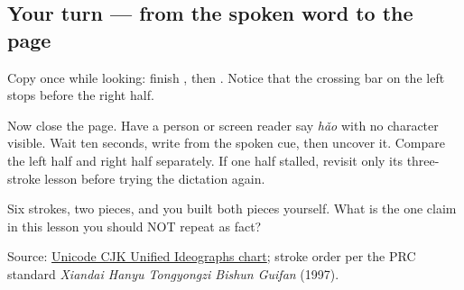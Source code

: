 \subsection*{Your turn — from the spoken word to the page}
Copy \textbf{} once while looking: finish \textbf{}, then \textbf{}. Notice that the crossing bar on the left stops before the right half.

Now close the page. Have a person or screen reader say \emph{hǎo} with no character visible. Wait ten seconds, write \textbf{} from the spoken cue, then uncover it. Compare the left half and right half separately. If one half stalled, revisit only its three-stroke lesson before trying the dictation again.

\begin{tcolorbox}[breakable,colback=teal!4,colframe=teal!35!black,title={Before you move on}]
Six strokes, two pieces, and you built both pieces yourself. What is the one claim in this lesson you should NOT repeat as fact?

Source: \href{https://www.unicode.org/charts/PDF/U4E00.pdf}{Unicode CJK Unified Ideographs chart}; stroke order per the PRC standard \emph{Xiandai Hanyu Tongyongzi Bishun Guifan} (1997).
\end{tcolorbox}
